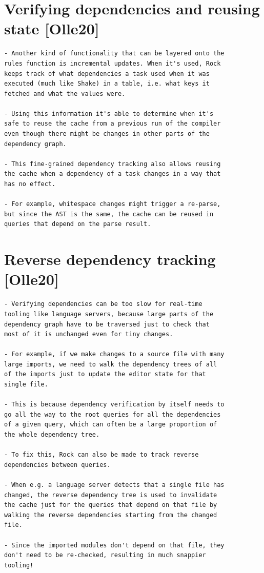 \section*{Verifying dependencies and reusing state [Olle20]}

\begin{verbatim}
- Another kind of functionality that can be layered onto the
rules function is incremental updates. When it's used, Rock
keeps track of what dependencies a task used when it was
executed (much like Shake) in a table, i.e. what keys it
fetched and what the values were.

- Using this information it's able to determine when it's
safe to reuse the cache from a previous run of the compiler
even though there might be changes in other parts of the
dependency graph.

- This fine-grained dependency tracking also allows reusing
the cache when a dependency of a task changes in a way that
has no effect.

- For example, whitespace changes might trigger a re-parse,
but since the AST is the same, the cache can be reused in
queries that depend on the parse result.
\end{verbatim}
\cite{olle_query_based}

\section*{Reverse dependency tracking [Olle20]}

\begin{verbatim}
- Verifying dependencies can be too slow for real-time
tooling like language servers, because large parts of the
dependency graph have to be traversed just to check that
most of it is unchanged even for tiny changes.

- For example, if we make changes to a source file with many
large imports, we need to walk the dependency trees of all
of the imports just to update the editor state for that
single file.

- This is because dependency verification by itself needs to
go all the way to the root queries for all the dependencies
of a given query, which can often be a large proportion of
the whole dependency tree.

- To fix this, Rock can also be made to track reverse
dependencies between queries.

- When e.g. a language server detects that a single file has
changed, the reverse dependency tree is used to invalidate
the cache just for the queries that depend on that file by
walking the reverse dependencies starting from the changed
file.

- Since the imported modules don't depend on that file, they
don't need to be re-checked, resulting in much snappier
tooling!
\end{verbatim}
\cite{olle_query_based}

